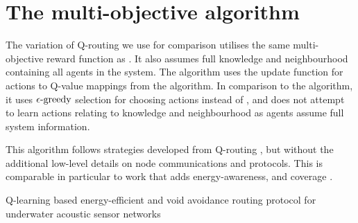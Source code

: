 \section{The multi-objective \acronymBaseline{}{} algorithm}
\label{appendix:algorithm-qrouting}

\newcommand{\functionEGreedy}[2]{
	\functionSignature{\epsilon\text{-greedy}}{#1}
}

The variation of Q-routing we use for comparison utilises the same multi-objective reward function as \acronymWSNOptimisation{}{}. It also assumes full knowledge and neighbourhood containing all agents in the system. The algorithm uses the update function for actions to Q-value mappings from the \acronymATARIA{}{} algorithm. In comparison to the \acronymATARIA{}{} algorithm, it uses $\functionEGreedy{}{}$ selection for choosing actions instead of \acronymRewardTrendsAlgorithm{}{}, and does not attempt to learn actions relating to knowledge and neighbourhood as agents assume full system information.

This algorithm follows strategies developed from Q-routing \citep{Boyan}, but without the additional low-level details on node communications and protocols. This is comparable in particular to work that adds energy-awareness\citep{Kiani2015}, and coverage \citep{XXX}. 

Q-learning based energy-efficient and void avoidance routing protocol for underwater acoustic sensor networks \citep{Khan2021}

